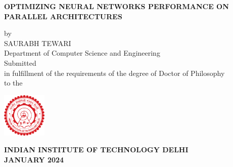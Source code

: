 
\begin{center}


\LARGE
\MakeUppercase{\textbf{OPTIMIZING NEURAL NETWORKS PERFORMANCE ON PARALLEL ARCHITECTURES}}\\
\vspace{1cm}

\large

{by}\\
\vspace{.3cm}
{SAURABH TEWARI}\\
\vspace{.3cm}
{Department of Computer Science and Engineering}\\
\vspace{2cm}
{Submitted}\\
\vspace{0.3cm}
{in fulfillment of the requirements of the degree of Doctor of Philosophy}\\
\vspace{3cm}
{to the }\\
\vspace{1cm}

\hspace{0cm}
\centering
\hbox{\includegraphics[width=5pc]{ThesisSpecificPages/iitd-logo.pdf}}

\vspace{0.3cm}
{\bf
\large{INDIAN INSTITUTE OF TECHNOLOGY DELHI}\\
\large{JANUARY 2024}\\
}


\end{center}


